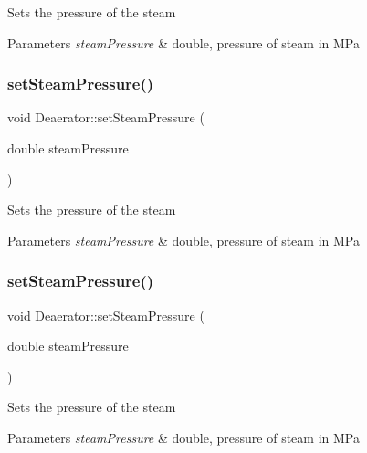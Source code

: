 Sets the pressure of the steam 
\begin{DoxyParams}{Parameters}
{\em steam\+Pressure} & double, pressure of steam in M\+Pa \\
\hline
\end{DoxyParams}
\mbox{\label{class_deaerator_a5936221e68b5ba3245f0adabed74e6d7}} 
\subsubsection{\texorpdfstring{set\+Steam\+Pressure()}{setSteamPressure()}\hspace{0.1cm}{\footnotesize\ttfamily [2/3]}}
{\footnotesize\ttfamily void Deaerator\+::set\+Steam\+Pressure (\begin{DoxyParamCaption}\item[{double}]{steam\+Pressure }\end{DoxyParamCaption})}

Sets the pressure of the steam 
\begin{DoxyParams}{Parameters}
{\em steam\+Pressure} & double, pressure of steam in M\+Pa \\
\hline
\end{DoxyParams}
\mbox{\label{class_deaerator_a5936221e68b5ba3245f0adabed74e6d7}} 
\subsubsection{\texorpdfstring{set\+Steam\+Pressure()}{setSteamPressure()}\hspace{0.1cm}{\footnotesize\ttfamily [3/3]}}
{\footnotesize\ttfamily void Deaerator\+::set\+Steam\+Pressure (\begin{DoxyParamCaption}\item[{double}]{steam\+Pressure }\end{DoxyParamCaption})}

Sets the pressure of the steam 
\begin{DoxyParams}{Parameters}
{\em steam\+Pressure} & double, pressure of steam in M\+Pa \\
\hline
\end{DoxyParams}


